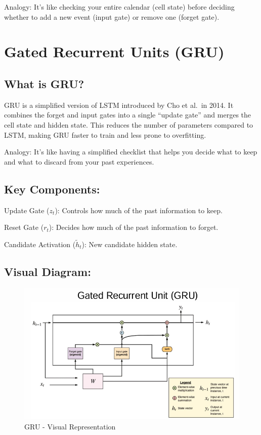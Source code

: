 \documentclass[
  letterpaper,
  DIV=11,
  numbers=noendperiod]{scrreprt}
\begin{document}
Analogy: It's like checking your entire calendar (cell state) before
deciding whether to add a new event (input gate) or remove one (forget
gate).

\section{Gated Recurrent Units (GRU)}\label{gated-recurrent-units-gru}

\subsection{What is GRU?}\label{what-is-gru}

GRU is a simplified version of LSTM introduced by Cho et al.~in 2014. It
combines the forget and input gates into a single ``update gate'' and
merges the cell state and hidden state. This reduces the number of
parameters compared to LSTM, making GRU faster to train and less prone
to overfitting.

Analogy: It's like having a simplified checklist that helps you decide
what to keep and what to discard from your past experiences.

\subsection{Key Components:}\label{key-components-2}

Update Gate (\(z_t\)): Controls how much of the past information to
keep.

Reset Gate (\(r_t\)): Decides how much of the past information to
forget.

Candidate Activation (\(\tilde{h}_t\)): New candidate hidden state.

\subsection{Visual Diagram:}\label{visual-diagram-1}

\begin{figure}[H]

{\centering \includegraphics[width=0.8\linewidth,height=\textheight,keepaspectratio]{chapter11_gru.png}

}

\caption{GRU - Visual Representation}

\end{figure}%
\end{document}
